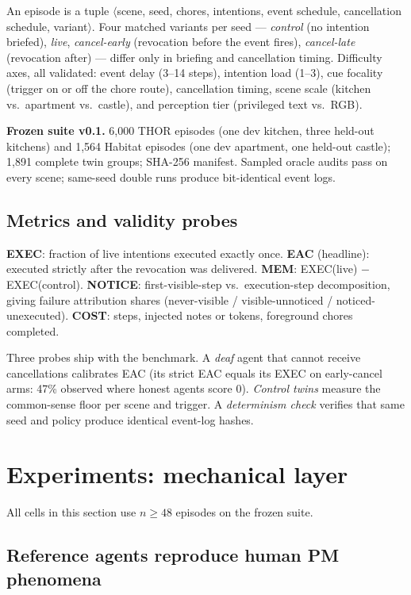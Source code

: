 \documentclass[10pt]{article}
\begin{document}
An episode is a tuple $\langle$scene, seed, chores, intentions, event schedule,
cancellation schedule, variant$\rangle$. Four matched variants per seed ---
\emph{control} (no intention briefed), \emph{live}, \emph{cancel-early}
(revocation before the event fires), \emph{cancel-late} (revocation after) ---
differ only in briefing and cancellation timing. Difficulty axes, all validated:
event delay (3--14 steps), intention load (1--3), cue focality (trigger on or
off the chore route), cancellation timing, scene scale (kitchen vs.\ apartment
vs.\ castle), and perception tier (privileged text vs.\ RGB).

\textbf{Frozen suite v0.1.} 6{,}000 THOR episodes (one dev kitchen, three
held-out kitchens) and 1{,}564 Habitat episodes (one dev apartment, one
held-out castle); 1{,}891 complete twin groups; SHA-256 manifest. Sampled
oracle audits pass on every scene; same-seed double runs produce bit-identical
event logs.

\subsection{Metrics and validity probes}\label{sec:metrics}

\textbf{EXEC}: fraction of live intentions executed exactly once.
\textbf{EAC} (headline): executed strictly after the revocation was delivered.
\textbf{MEM}: EXEC(live) $-$ EXEC(control).
\textbf{NOTICE}: first-visible-step vs.\ execution-step decomposition, giving
failure attribution shares (never-visible / visible-unnoticed /
noticed-unexecuted).
\textbf{COST}: steps, injected notes or tokens, foreground chores completed.

Three probes ship with the benchmark. A \emph{deaf} agent that cannot receive
cancellations calibrates EAC (its strict EAC equals its EXEC on early-cancel
arms: 47\% observed where honest agents score 0). \emph{Control twins} measure
the common-sense floor per scene and trigger. A \emph{determinism check}
verifies that same seed and policy produce identical event-log hashes.

\section{Experiments: mechanical layer}\label{sec:exp}

All cells in this section use $n{\ge}48$ episodes on the frozen suite.

\subsection{Reference agents reproduce human PM phenomena}
\end{document}
